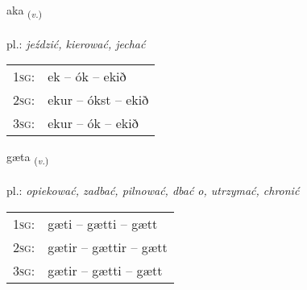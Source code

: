 \documentclass[frontgrid, backgrid]{flacards}\usepackage[]{graphicx}\usepackage[]{xcolor}
\begin{document}
\renewcommand{\blhead}{\vskip5pt {\small\bfseries\footnotesize Sagnorð | czasownik }}
\renewcommand{\bcfoot}{\vskip5pt \hspace{2pt}{\small\bfseries\footnotesize 1K}}


{aka \small{\textsubscript{(\textit{v.})}} \\[1ex] %
\textphonetic{[aːka]} \\
pl.: \emph{jeździć, kierować, jechać} \\  [2ex]
\renewcommand*{\arraystretch}{0.8}
\begin{tabular}{p{1cm}l}
\textsc{1sg}: & ek -- ók -- ekið \\ 
\textsc{2sg}: & ekur -- ókst -- ekið \\ 
\textsc{3sg}: & ekur -- ók -- ekið \\ 
\end{tabular}
}

\renewcommand{\flhead}{\vskip5pt \fboxsep=0pt {\small\bfseries\footnotesize Sagnorð | czasownik}}
\renewcommand{\fcfoot}{\vskip5pt \fboxsep=0pt \hspace{2pt}{\small\bfseries\footnotesize 1K}}

\renewcommand{\blhead}{\vskip5pt {\small\bfseries\footnotesize Sagnorð | czasownik }}
\renewcommand{\bcfoot}{\vskip5pt \hspace{2pt}{\small\bfseries\footnotesize 1K}}


{gæta \small{\textsubscript{(\textit{v.})}} \\[1ex] %
\textphonetic{[caiːta]} \\
pl.: \emph{opiekować, zadbać, pilnować, dbać o, utrzymać, chronić} \\  [2ex]
\renewcommand*{\arraystretch}{0.8}
\begin{tabular}{p{1cm}l}
\textsc{1sg}: & gæti -- gætti -- gætt \\ 
\textsc{2sg}: & gætir -- gættir -- gætt \\ 
\textsc{3sg}: & gætir -- gætti -- gætt \\ 
\end{tabular}
}
\end{document}
